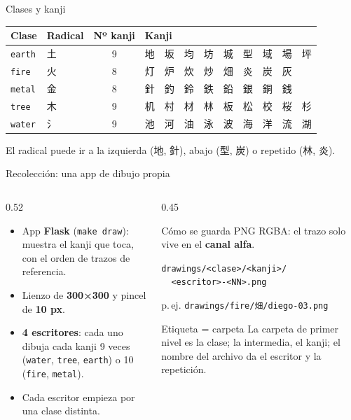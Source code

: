 \documentclass[aspectratio=169,11pt]{beamer}
\newcommand{\jp}[1]{{\cjkfont #1}}
\begin{document}
\begin{frame}{Clases y kanji}
  \centering
  \renewcommand{\arraystretch}{1.35}
  \begin{tabular}{llcl}
    \toprule
    Clase & Radical & Nº kanji & Kanji \\
    \midrule
    \texttt{earth} & \textcolor{earth}{\jp{土}} & 9 & \jp{地　坂　均　坊　城　型　域　場　坪} \\
    \texttt{fire}  & \textcolor{fire}{\jp{火}}  & 8 & \jp{灯　炉　炊　炒　畑　炎　炭　灰} \\
    \texttt{metal} & \textcolor{metal}{\jp{金}} & 8 & \jp{針　釣　鈴　鉄　鉛　銀　銅　銭} \\
    \texttt{tree}  & \textcolor{tree}{\jp{木}}  & 9 & \jp{机　村　材　林　板　松　校　桜　杉} \\
    \texttt{water} & \textcolor{water}{\jp{氵}} & 9 & \jp{池　河　油　泳　波　海　洋　流　湖} \\
    \bottomrule
  \end{tabular}

  \bigskip
  \small El radical puede ir a la izquierda (\jp{地}, \jp{針}), abajo (\jp{型}, \jp{炭}) o repetido (\jp{林}, \jp{炎}).
\end{frame}

\begin{frame}[fragile]{Recolección: una app de dibujo propia}
  \begin{columns}[T]
    \begin{column}{0.52\textwidth}
      \begin{itemize}
        \item App \textbf{Flask} (\texttt{make draw}): muestra el kanji que toca, con el orden de trazos de referencia.
        \item Lienzo de \textbf{300×300} y pincel de \textbf{10 px}.
        \item \textbf{4 escritores}: cada uno dibuja cada kanji 9 veces (\texttt{water}, \texttt{tree}, \texttt{earth}) o 10 (\texttt{fire}, \texttt{metal}).
        \item Cada escritor empieza por una clase distinta.
      \end{itemize}
    \end{column}
    \begin{column}{0.45\textwidth}
      \begin{block}{Cómo se guarda}
        \small
        PNG RGBA: el trazo solo vive en el \textbf{canal alfa}.

        \medskip
        \texttt{drawings/<clase>/<kanji>/}\\
        \texttt{\ \ <escritor>-<NN>.png}

        \medskip
        p.\,ej. \texttt{drawings/fire/\jp{畑}/diego-03.png}
      \end{block}
      \begin{block}{Etiqueta = carpeta}
        \small La carpeta de primer nivel es la clase; la intermedia, el kanji; el nombre del archivo da el escritor y la repetición.
      \end{block}
    \end{column}
  \end{columns}
\end{frame}
\end{document}

